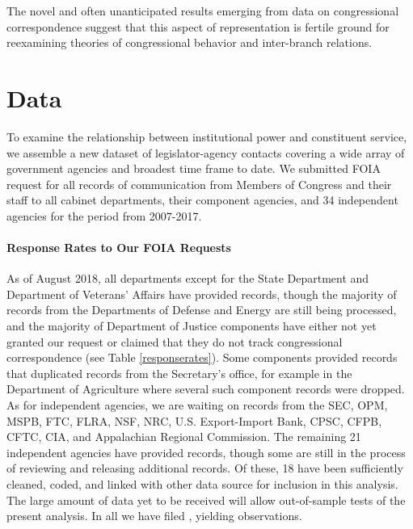 \documentclass{article}
\begin{document}
The novel and often unanticipated results emerging from data on congressional correspondence suggest that this aspect of representation is fertile ground for reexamining theories of congressional behavior and inter-branch relations. 




\section{Data} 
To examine the relationship between institutional power and constituent service, we assemble a new dataset of legislator-agency contacts covering a wide array of government agencies and broadest time frame to date. We submitted FOIA request for all records of communication from Members of Congress and their staff to all cabinet departments, their component agencies, and 34 independent agencies for the period from 2007-2017.

\paragraph{Response Rates to Our FOIA Requests} As of August 2018, all departments except for the State Department and Department of Veterans' Affairs have provided records, though the majority of records from the Departments of Defense and Energy are still being processed, and the majority of Department of Justice components have either not yet granted our request or claimed that they do not track congressional correspondence (see Table \ref{responserates}). Some components provided records that duplicated records from the Secretary's office, for example in the Department of Agriculture where several such component records were dropped. As for independent agencies, we are waiting on records from the SEC, OPM, MSPB, FTC, FLRA, NSF, NRC, U.S. Export-Import Bank, CPSC, CFPB, CFTC, CIA, and Appalachian Regional Commission. The remaining 21 independent agencies have provided records, though some are still in the process of reviewing and releasing additional records. Of these, 18 have been sufficiently cleaned, coded, and linked with other data source for inclusion in this analysis. The large amount of data yet to be received will allow out-of-sample tests of the present analysis. In all we have filed \unskip, yielding \unskip observations.
\end{document}
